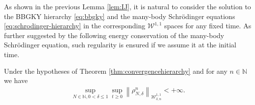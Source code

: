 As shown in the previous Lemma \ref{lem:IJ}, it is natural to consider the solution to the BBGKY hierarchy \eqref{eq:bbgky} and the many-body Schrödinger equations \eqref{eq:schrodinger-hierarchy} in the corresponding $\mathcal{W}^{1, 1}$ spaces for any fixed time. As further suggested by the following energy conservation of the many-body Schrödinger equation, such regularity is ensured if we assume it at the initial time. 

\begin{lem}\label{lem:boundrhoN} Under the hypotheses of Theorem \ref{thm:convergencehierarchy} and for any $n \in \mathbb{N}$ we have
  \begin{align}\label{eq:apriori-energy-MB}
    \sup_{N \in \mathbb{N}, 0 < \delta \leqslant 1} \sup_{t \geq 0} \left \| \rho^n_{N, \delta}
    \right\|_{ \mathcal{W}^{1, 1}_{\delta, n}} < + \infty.
  \end{align}
\end{lem}

